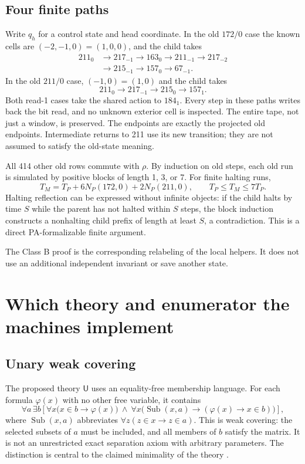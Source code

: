 \documentclass[11pt,a4paper]{article}
\newcommand{\UU}{\mathsf{U}}
\newcommand{\Sub}{\operatorname{Sub}}
\begin{document}
\subsection{Four finite paths}

Write $q_h$ for a control state and head coordinate. In the old $172/0$
case the known cells are $(-2,-1,0)=(1,0,0)$, and the child takes
\begin{align*}
211_0&\to217_{-1}\to163_0\to211_{-1}\to217_{-2}\\
 &\to215_{-1}\to157_0\to67_{-1}.
\end{align*}
In the old $211/0$ case, $(-1,0)=(1,0)$ and the child takes
\[
211_0\to217_{-1}\to215_0\to157_1.
\]
Both read-1 cases take the shared action to $184_1$. Every step in these
paths writes back the bit read, and no unknown exterior cell is inspected.
The entire tape, not just a window, is preserved. The endpoints are exactly
the projected old endpoints. Intermediate returns to 211 use its new
transition; they are not assumed to satisfy the old-state meaning.

All 414 other old rows commute with $\rho$. By induction on old steps,
each old run is simulated by positive blocks of length 1, 3, or 7.
For finite halting runs,
\begin{equation}\label{eq:time}
T_M=T_P+6N_P(172,0)+2N_P(211,0),\qquad T_P\leq T_M\leq7T_P.
\end{equation}
Halting reflection can be expressed without infinite objects: if the child
halts by time $S$ while the parent has not halted within $S$ steps, the
block induction constructs a nonhalting child prefix of length at least
$S$, a contradiction. This is a direct PA-formalizable finite argument.

The Class B proof is the corresponding relabeling of the local helpers.
It does not use an additional independent invariant or save another state.

\section{Which theory and enumerator the machines implement}\label{sec:logic}

\subsection{Unary weak covering}

The proposed theory $\UU$ uses an equality-free membership language. For
each formula $\varphi(x)$ with no other free variable, it contains
\begin{equation}\label{eq:U}
\forall a\,\exists b\left[
 \forall x\bigl(x\in b\to\varphi(x)\bigr)\ \land\
 \forall x\bigl(\Sub(x,a)\to(\varphi(x)\to x\in b)\bigr)\right],
\end{equation}
where $\Sub(x,a)$ abbreviates
$\forall z(z\in x\to z\in a)$. This is weak covering: the selected
subsets of $a$ must be included, and all members of $b$ satisfy the matrix.
It is not an unrestricted exact separation axiom with arbitrary parameters.
The distinction is central to the claimed minimality of the theory
\cite{unary}.
\end{document}
